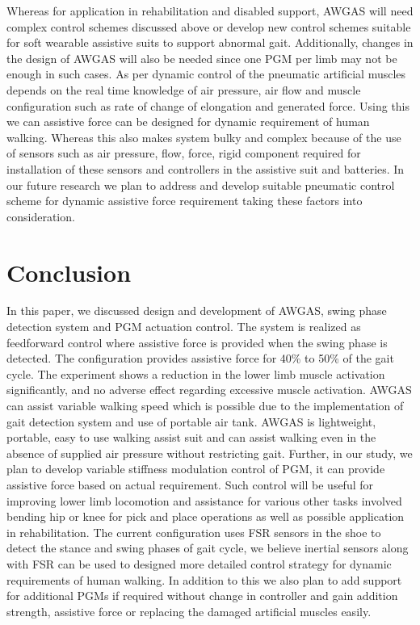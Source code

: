 \documentclass[paper,JRM,paper]{jaciiiarticle}
\begin{document}
Whereas for application in rehabilitation and disabled support, AWGAS will need complex control schemes discussed above or develop new control schemes suitable for soft wearable assistive suits to support abnormal gait. Additionally, changes in the design of AWGAS will also be needed since one PGM per limb may not be enough in such cases. 
As per \cite{25,29} dynamic control of the pneumatic artificial muscles depends on the real time knowledge of air pressure, air flow and muscle configuration such as rate of change of elongation and generated force. Using this we can assistive force can be designed for dynamic requirement of human walking. Whereas this also makes system bulky and complex because of the use of sensors such as air pressure, flow, force, rigid component required for installation of these sensors and controllers in the assistive suit and batteries. In our future research we plan to address and develop suitable pneumatic control scheme for dynamic assistive force requirement taking these factors into consideration.



\section{Conclusion}

In this paper, we discussed design and development of AWGAS, swing phase detection system and PGM actuation control. The system is realized as feedforward control where assistive force is provided when the swing phase is detected. The configuration provides assistive force for 40\% to 50\% of the gait cycle. The experiment shows a reduction in the lower limb muscle activation significantly, and no adverse effect regarding excessive muscle activation. AWGAS can assist variable walking speed which is possible due to the implementation of gait detection system and use of portable air tank. AWGAS is lightweight, portable, easy to use walking assist suit and can assist walking even in the absence of supplied air pressure without restricting gait. Further, in our study, we plan to develop variable stiffness modulation control of PGM, it can provide assistive force based on actual requirement. Such control will be useful for improving lower limb locomotion and assistance for various other tasks involved bending hip or knee for pick and place operations as well as possible application in rehabilitation. The current configuration uses FSR sensors in the shoe to detect the stance and swing phases of gait cycle, we believe inertial sensors along with FSR can be used to designed more detailed control strategy for dynamic requirements of human walking. In addition to this we also plan to add support for additional PGMs if required without change in controller and gain addition strength, assistive force or replacing the damaged artificial muscles easily. 
\end{document}
